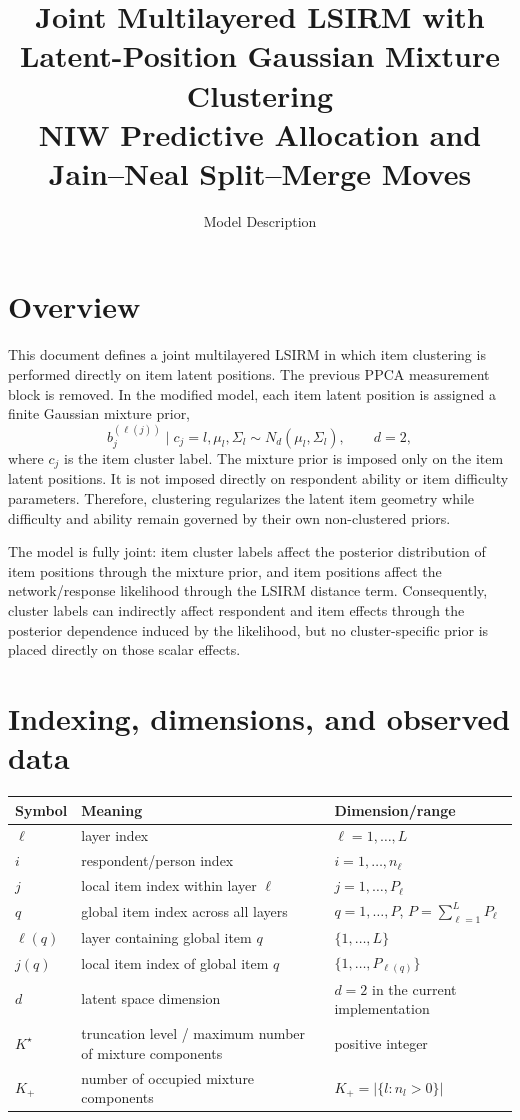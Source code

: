 \documentclass[11pt]{article}
\title{Joint Multilayered LSIRM with Latent-Position Gaussian Mixture Clustering\\
NIW Predictive Allocation and Jain--Neal Split--Merge Moves}
\date{Model Description}
\begin{document}
\maketitle

\section{Overview}

This document defines a joint multilayered LSIRM in which item clustering is
performed directly on item latent positions.  The previous PPCA measurement
block is removed.  In the modified model, each item latent position is assigned
a finite Gaussian mixture prior,
\[
    b_j^{(\ell(j))}\mid c_j=l,\mu_l,\Sigma_l
    \sim N_d(\mu_l,\Sigma_l),
    \qquad d=2,
\]
where $c_j$ is the item cluster label.  The mixture prior is imposed only on
the item latent positions.  It is not imposed directly on respondent ability or
item difficulty parameters.  Therefore, clustering regularizes the latent item
geometry while difficulty and ability remain governed by their own non-clustered
priors.

The model is fully joint: item cluster labels affect the posterior distribution
of item positions through the mixture prior, and item positions affect the
network/response likelihood through the LSIRM distance term.  Consequently,
cluster labels can indirectly affect respondent and item effects through the
posterior dependence induced by the likelihood, but no cluster-specific prior is
placed directly on those scalar effects.

\section{Indexing, dimensions, and observed data}

\begin{center}
\begin{tabular}{lll}
\toprule
Symbol & Meaning & Dimension/range \\
\midrule
$\ell$ & layer index & $\ell=1,\dots,L$ \\
$i$ & respondent/person index & $i=1,\dots,n_\ell$ \\
$j$ & local item index within layer $\ell$ & $j=1,\dots,P_\ell$ \\
$q$ & global item index across all layers & $q=1,\dots,P$, $P=\sum_{\ell=1}^L P_\ell$ \\
$\ell(q)$ & layer containing global item $q$ & $\{1,\dots,L\}$ \\
$j(q)$ & local item index of global item $q$ & $\{1,
\dots,P_{\ell(q)}\}$ \\
$d$ & latent space dimension & $d=2$ in the current implementation \\
$K^\star$ & truncation level / maximum number of mixture components & positive integer \\
$K_+$ & number of occupied mixture components & $K_+=|\{l:n_l>0\}|$ \\
\bottomrule
\end{tabular}
\end{center}
\end{document}
